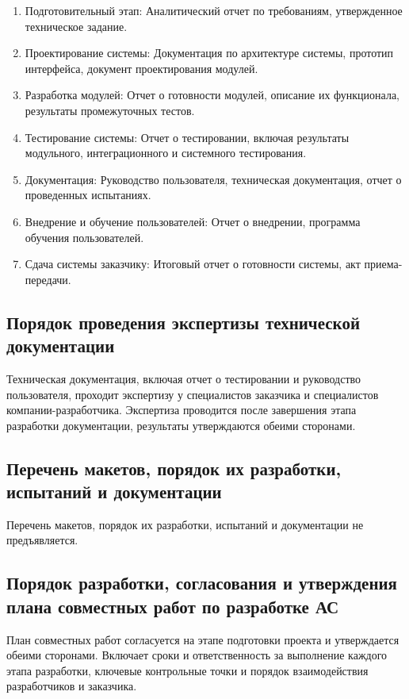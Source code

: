\begin{enumerate}
	\item Подготовительный этап:
		Аналитический отчет по требованиям, утвержденное техническое задание.
	\item Проектирование системы:
		Документация по архитектуре системы,
		прототип интерфейса, документ проектирования модулей.
	\item Разработка модулей:
		Отчет о готовности модулей, описание их функционала,
		результаты промежуточных тестов.
	\item Тестирование системы:
		Отчет о тестировании, включая результаты модульного,
		интеграционного и системного тестирования.
	\item Документация:
		Руководство пользователя, техническая документация,
		отчет о проведенных испытаниях.
	\item Внедрение и обучение пользователей:
		Отчет о внедрении, программа обучения пользователей.
	\item Сдача системы заказчику:
		Итоговый отчет о готовности системы, акт приема-передачи.
\end{enumerate}

\subsection{Порядок проведения экспертизы технической документации}

Техническая документация, включая отчет о тестировании
и руководство пользователя, проходит экспертизу у специалистов заказчика
и специалистов компании-разработчика.
Экспертиза проводится после завершения этапа разработки документации,
результаты утверждаются обеими сторонами. 

\subsection{Перечень макетов, порядок их разработки, испытаний и документации}

Перечень макетов, порядок их разработки, испытаний
и документации не предъявляется.

\subsection{Порядок разработки, согласования
	и утверждения плана совместных работ по разработке АС}

План совместных работ согласуется на этапе подготовки проекта
и утверждается обеими сторонами.
Включает сроки и ответственность за выполнение каждого этапа разработки,
ключевые контрольные точки и порядок взаимодействия разработчиков и заказчика. 

